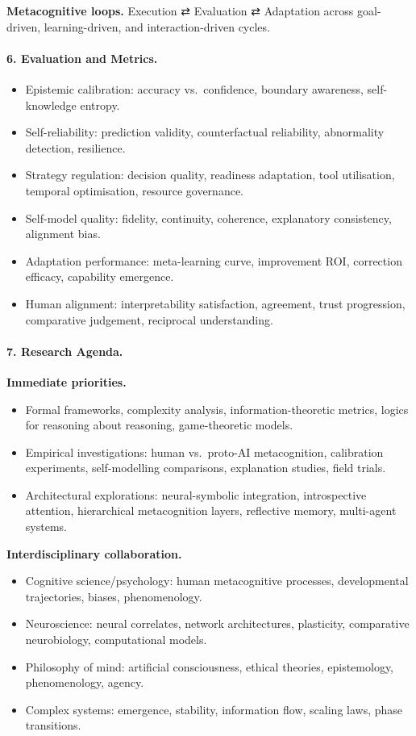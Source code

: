 \documentclass[12pt]{article}
\begin{document}
\textbf{Metacognitive loops.} Execution ⇄ Evaluation ⇄ Adaptation across goal-driven, learning-driven, and interaction-driven cycles.

\paragraph{6. Evaluation and Metrics.}
\begin{itemize}
\item Epistemic calibration: accuracy vs.\ confidence, boundary awareness, self-knowledge entropy.
\item Self-reliability: prediction validity, counterfactual reliability, abnormality detection, resilience.
\item Strategy regulation: decision quality, readiness adaptation, tool utilisation, temporal optimisation, resource governance.
\item Self-model quality: fidelity, continuity, coherence, explanatory consistency, alignment bias.
\item Adaptation performance: meta-learning curve, improvement ROI, correction efficacy, capability emergence.
\item Human alignment: interpretability satisfaction, agreement, trust progression, comparative judgement, reciprocal understanding.
\end{itemize}

\paragraph{7. Research Agenda.}
\textbf{Immediate priorities.}
\begin{itemize}
\item Formal frameworks, complexity analysis, information-theoretic metrics, logics for reasoning about reasoning, game-theoretic models.
\item Empirical investigations: human vs.\ proto-AI metacognition, calibration experiments, self-modelling comparisons, explanation studies, field trials.
\item Architectural explorations: neural-symbolic integration, introspective attention, hierarchical metacognition layers, reflective memory, multi-agent systems.
\end{itemize}

\textbf{Interdisciplinary collaboration.}
\begin{itemize}
\item Cognitive science/psychology: human metacognitive processes, developmental trajectories, biases, phenomenology.
\item Neuroscience: neural correlates, network architectures, plasticity, comparative neurobiology, computational models.
\item Philosophy of mind: artificial consciousness, ethical theories, epistemology, phenomenology, agency.
\item Complex systems: emergence, stability, information flow, scaling laws, phase transitions.
\end{itemize}
\end{document}
